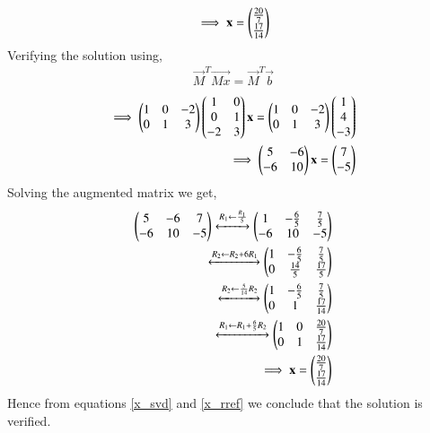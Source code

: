 \documentclass[journal,12pt,twocolumn]{IEEEtran}
\begin{document}
\begin{align}
\implies \mathbf{x} = \begin{pmatrix}\frac{20}{7}\\\frac{17}{14}\end{pmatrix} \label{x_svd}
\end{align}
Verifying the solution using,
\begin{align}
\vec{M}^T\vec{Mx} = \vec{M}^T\vec{b}
\end{align}
\begin{align}
\implies \begin{pmatrix}1&0&-2\\0&1&3\end{pmatrix} \begin{pmatrix}1&0\\0&1\\-2&3\end{pmatrix} \mathbf{x} = \begin{pmatrix}1&0&-2\\0&1&3\end{pmatrix}\begin{pmatrix}1\\4\\-3\end{pmatrix}\\
\implies \begin{pmatrix}5&-6\\-6&10\end{pmatrix}\mathbf{x} = \begin{pmatrix}7\\-5\end{pmatrix}
\end{align}
Solving the augmented matrix we get,
\begin{align}
\begin{pmatrix}5&-6&7\\-6&10&-5\end{pmatrix}\xleftrightarrow[]{R_1\leftarrow\frac{R_1}{5}}\begin{pmatrix}1&-\frac{6}{5}&\frac{7}{5}\\-6&10&-5\end{pmatrix}\\
\xleftrightarrow[]{R_2\leftarrow R_2+6R_1}\begin{pmatrix}1&-\frac{6}{5}&\frac{7}{5}\\0&\frac{14}{5}&\frac{17}{5}\end{pmatrix}\\
\xleftrightarrow[]{R_2\leftarrow \frac{5}{14}R_2}\begin{pmatrix}1&-\frac{6}{5}&\frac{7}{5}\\0&1&\frac{17}{14}\end{pmatrix}\\
\xleftrightarrow[]{R_1\leftarrow R_1+\frac{6}{5}R_2}\begin{pmatrix}1&0&\frac{20}{7}\\0&1&\frac{17}{14}\end{pmatrix}\\
\implies \mathbf{x} = \begin{pmatrix}\frac{20}{7}\\\frac{17}{14}\end{pmatrix}\label{x_rref}
\end{align}
Hence from equations \eqref{x_svd} and \eqref{x_rref} we conclude that the solution is verified.  
\end{document}
